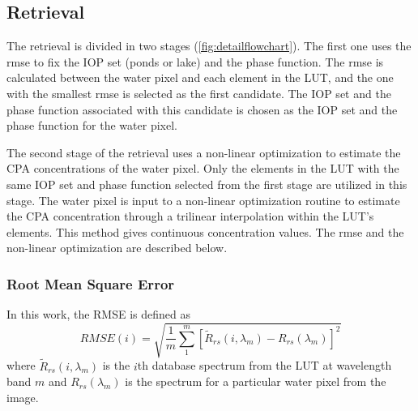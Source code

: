 \subsection{Retrieval}
The retrieval is divided in two stages (\autoref{fig:detailflowchart}). The first one uses the \acrfull{rmse} to fix the IOP set (ponds or lake) and the phase function. The \gls{rmse} is calculated between the water pixel and each element in the LUT, and the one with the smallest \gls{rmse} is selected as the first candidate. The IOP set and the phase function associated with this candidate is chosen as the IOP set and the phase function for the water pixel.

The second stage of the retrieval uses a non-linear optimization to estimate the CPA concentrations of the water pixel. Only the elements in the LUT with the same IOP set and phase function selected from the first stage are utilized in this stage. The water pixel is input to a non-linear optimization routine to estimate the CPA concentration through a trilinear interpolation within the LUT's elements. This method gives continuous concentration values. The \gls{rmse} and the non-linear optimization are described below.
\subsubsection{Root Mean Square Error}
In this work, the RMSE is defined as
\begin{equation}
  RMSE(i) = \sqrt{\frac{1}{m}\sum_1^m\left[\widetilde{R}_{rs}(i,\lambda_m)-R_{rs}(\lambda_m)\right]^2}
\end{equation}
where $\widetilde{R}_{rs}(i,\lambda_m)$ is the $i$th database spectrum from the LUT at wavelength band $m$ and $R_{rs}(\lambda_m)$ is the spectrum for a particular water pixel from the image.

